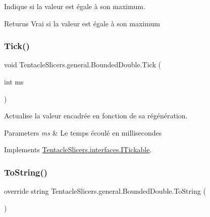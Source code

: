 Indique si la valeur est égale à son maximum. 

\begin{DoxyReturn}{Returns}
Vrai si la valeur est égale à son maximum 
\end{DoxyReturn}
\mbox{\label{class_tentacle_slicers_1_1general_1_1_bounded_double_a4b526f05b7941e604fd6fd1fffd0f6e2}} 
\subsubsection{\texorpdfstring{Tick()}{Tick()}}
{\footnotesize\ttfamily void Tentacle\+Slicers.\+general.\+Bounded\+Double.\+Tick (\begin{DoxyParamCaption}\item[{int}]{ms }\end{DoxyParamCaption})}



Actualise la valeur encadrée en fonction de sa régénération. 


\begin{DoxyParams}{Parameters}
{\em ms} & Le temps écoulé en millisecondes \\
\hline
\end{DoxyParams}


Implements \hyperlink{interface_tentacle_slicers_1_1interfaces_1_1_i_tickable}{Tentacle\+Slicers.\+interfaces.\+I\+Tickable}.

\mbox{\label{class_tentacle_slicers_1_1general_1_1_bounded_double_af752b916206e8a8481cc9eeb201ed68e}} 
\subsubsection{\texorpdfstring{To\+String()}{ToString()}}
{\footnotesize\ttfamily override string Tentacle\+Slicers.\+general.\+Bounded\+Double.\+To\+String (\begin{DoxyParamCaption}{ }\end{DoxyParamCaption})}



